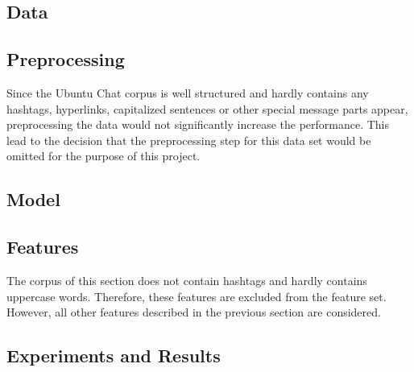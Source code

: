 \documentclass{article} %
\begin{document}
\subsection{Data}\label{sec:ubuntudata}



\subsection{Preprocessing}

Since the Ubuntu Chat corpus is well structured and hardly contains any hashtags, hyperlinks, capitalized sentences or other special message parts appear, preprocessing the data would not significantly increase the performance. This lead to the decision that the preprocessing step for this data set would be omitted for the purpose of this project.


\subsection{Model}



\subsection{Features}

\noindent The corpus of this section does not contain hashtags and hardly contains uppercase words. Therefore, these features are excluded from the feature set. However, all other features described in the previous section are considered.

\begin{comment}
\noindent The features used in this part of the project correspond to the ones already discussed in section \ref{sec:features}. Note that some features, such as numbers of positive or negative words in hashtags are not applicable in the current setting, since the data does not contain hashtags. Thus, such features have not been considered. 
\end{comment}

\subsection{Experiments and Results}

\end{document}
